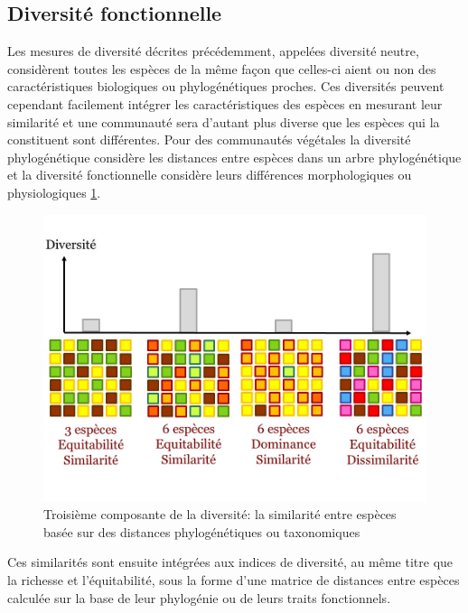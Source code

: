\documentclass[
  11pt,
  french,
  A4paper,
  extrafontsizes,onecolumn,openright
  ]{memoir}
\begin{document}
\subsection{Diversité fonctionnelle}\label{diversite-fonctionnelle}

Les mesures de diversité décrites précédemment, appelées diversité
neutre, considèrent toutes les espèces de la même façon que celles-ci
aient ou non des caractéristiques biologiques ou phylogénétiques
proches. Ces diversités peuvent cependant facilement intégrer les
caractéristiques des espèces en mesurant leur similarité et une
communauté sera d'autant plus diverse que les espèces qui la constituent
sont différentes. Pour des communautés végétales la diversité
phylogénétique considère les distances entre espèces dans un arbre
phylogénétique et la diversité fonctionnelle considère leurs différences
morphologiques ou physiologiques \ref{fig:RichEquSim}.

\begin{figure}

{\centering \includegraphics[width=0.6\linewidth]{ExternalFig/Fig_RichnessEquitabilitySimilarity} 

}

\caption{Troisième composante de la diversité: la similarité entre espèces basée sur des distances phylogénétiques ou taxonomiques}\label{fig:RichEquSim}
\end{figure}

Ces similarités sont ensuite intégrées aux indices de diversité, au même
titre que la richesse et l'équitabilité, sous la forme d'une matrice de
distances entre espèces calculée sur la base de leur phylogénie ou de
leurs traits fonctionnels.
\end{document}
